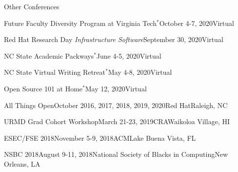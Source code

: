 \documentclass{resume} %
\begin{document}
\begin{rSection}{Other Conferences}
\begin{sSubsection}{Future Faculty Diversity Program at Virginia Tech$^*$}{October 4-7, 2020}{}{Virtual}
\end{sSubsection}
\vspace{-5pt}
\begin{sSubsection}{Red Hat Research Day \textit{Infrastructure Software}}{September 30, 2020}{}{Virtual}
\end{sSubsection}
\vspace{-5pt}
\begin{sSubsection}{NC State Academic Packways$^*$}{June 4-5, 2020}{}{Virtual}
\end{sSubsection}
\vspace{-5pt}
\begin{sSubsection}{NC State Virtual Writing Retreat$^*$}{May 4-8, 2020}{}{Virtual}
\end{sSubsection}
\vspace{-5pt}
\begin{sSubsection}{Open Source 101 at Home$^*$}{May 12, 2020}{}{Virtual}
\end{sSubsection}
\vspace{-5pt}
\begin{sSubsection}{All Things Open}{October 2016, 2017, 2018, 2019, 2020}{Red Hat}{Raleigh, NC}
\end{sSubsection}
\vspace{-5pt}
\begin{sSubsection}{URMD Grad Cohort Workshop}{March 21-23, 2019}{CRA}{Waikoloa Village, HI}
\end{sSubsection}
\vspace{-5pt}
\begin{sSubsection}{ESEC/FSE 2018}{November 5-9, 2018}{ACM}{Lake Buena Vista, FL}
\end{sSubsection}
\vspace{-5pt}
\begin{sSubsection}{NSBC 2018}{August 9-11, 2018}{National Society of Blacks in Computing}{New Orleans, LA}

\end{sSubsection}
\end{rSection}
\end{document}
